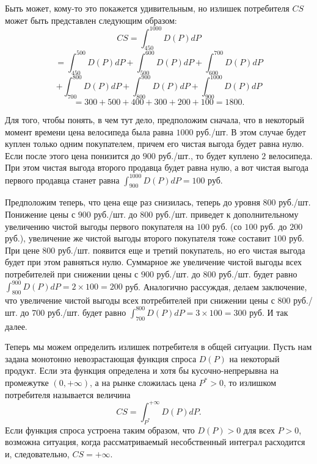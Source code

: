    Быть может, кому-то это покажется удивительным, но излишек
    потребителя $CS$ может быть представлен следующим образом:
    \[CS=\int_{450}^{1000}D(P)dP\]
    \[=\int_{450}^{500}D(P)dP
    + \int_{500}^{600}D(P)dP+\int_{600}^{700}D(P)dP\]
    \[+\int_{700}^{800}D(P)dP +\int_{800}^{900}D(P)dP
    +\int_{900}^{1000}D(P)dP\]
    \[=300+500+400+300+200+100=1800.\]

    Для того, чтобы понять, в чем тут дело,
    предположим сначала, что в некоторый момент времени цена
    велосипеда была равна $1000$ руб./шт. В этом случае будет
    куплен только одним покупателем, причем его чистая выгода
    будет равна нулю. Если после этого цена понизится до $900$ руб./шт.,
    то будет куплено $2$ велосипеда. При этом чистая выгода второго
    продавца будет равна нулю, а вот чистая выгода первого продавца
    станет равна  $\int_{900}^{1000}D(P)dP=100$ руб.

    Предположим теперь, что цена еще раз снизилась, теперь до уровня
     $800$ руб./шт. Понижение цены с $900$ руб./шт. до $800$ руб./шт.
     приведет к дополнительному увеличению чистой выгоды первого
     покупателя на $100$ руб. (со $100$ руб. до $200$ руб.), увеличение
     же чистой выгоды второго покупателя тоже составит $100$ руб.
     При цене $800$ руб./шт. появится еще и третий покупатель, но
     его чистая выгода будет при этом равняться нулю. Суммарное
     же увеличение чистой выгоды всех потребителей при снижении цены
      с $900$ руб./шт. до $800$ руб./шт. будет равно
      $\int_{800}^{900}D(P)dP=2\times100=200$ руб.
      Аналогично рассуждая, делаем заключение, что увеличение чистой
      выгоды всех потребителей при снижении цены с $800$ руб./шт. до
      $700$ руб./шт. будет равно  $\int_{700}^{800}D(P)dP=3\times100=300$ руб.
      И так далее.

      Теперь мы можем определить излишек потребителя в общей ситуации.
      Пусть нам задана монотонно невозрастающая функция спроса $D(P)$ на
      некоторый продукт. Если эта функция определена и хотя бы кусочно-непрерывна
      на промежутке $(0,+\infty)$, а на рынке
      сложилась цена $P^{*}>0$, то излишком потребителя называется величина
\begin{equation}
\label{opr-iz-ptr1}
      CS=\int_{P^{*}}^{+\infty}D(P)dP .
\end{equation}
      Если функция спроса устроена таким образом, что $D(P)>0$ для
      всех $P>0$, возможна ситуация, когда рассматриваемый несобственный интеграл расходится
    и, следовательно, $CS=+\infty$.



